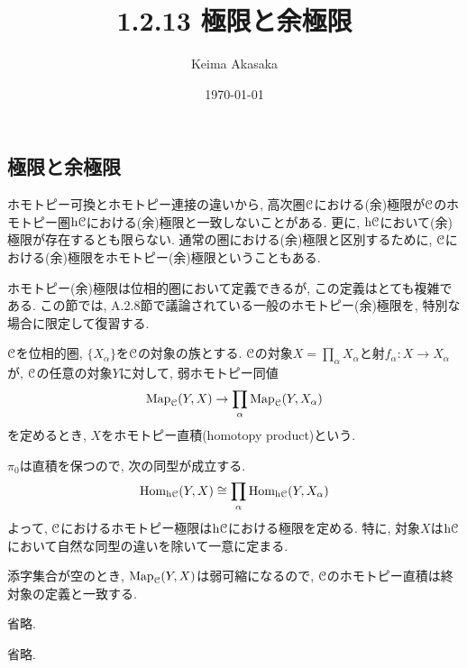 \documentclass[uplatex, a4paper, 14Q, dvipdfmx]{jsreport}
\title{1.2.13 極限と余極限}
\author{Keima Akasaka}
\date{\today}
\begin{document}

\setcounter{chapter}{1}
\setcounter{section}{2} 
\setcounter{subsection}{12}   
\setcounter{subsubsection}{1}

\subsection{極限と余極限}

ホモトピー可換とホモトピー連接の違いから, 高次圏$\mathcal{C}$における(余)極限が$\mathcal{C}$のホモトピー圏$\mathrm{h}\mathcal{C}$における(余)極限と一致しないことがある. 
更に, $\mathrm{h}\mathcal{C}$において(余)極限が存在するとも限らない. 
通常の圏における(余)極限と区別するために, $\mathcal{C}$における(余)極限をホモトピー(余)極限ということもある. 

ホモトピー(余)極限は位相的圏において定義できるが, この定義はとても複雑である. 
この節では, A.2.8節で議論されている一般のホモトピー(余)極限を, 特別な場合に限定して復習する.

\begin{example} \label{eg.1.2.13.1}
  $\mathcal{C}$を位相的圏, $\{X_\alpha\}$を$\mathcal{C}$の対象の族とする. 
  $\mathcal{C}$の対象$X = \prod_{\alpha}X_\alpha$と射$f_\alpha : X \to X_\alpha$が, $\mathcal{C}$の任意の対象$Y$に対して, 弱ホモトピー同値
  \begin{align*}
    \mathrm{Map}_{\mathcal{C}}(Y,X) \to \prod_{\alpha} \mathrm{Map}_{\mathcal{C}}(Y,X_\alpha)
  \end{align*}
  を定めるとき, $X$をホモトピー直積(homotopy product)という. 

  $\pi_0$は直積を保つので, 次の同型が成立する.
  \begin{align*}
    \mathrm{Hom}_{\mathrm{h}\mathcal{C}}(Y,X) \cong \prod_{\alpha} \mathrm{Hom}_{\mathrm{h}\mathcal{C}}(Y,X_\alpha)
  \end{align*}
  よって, $\mathcal{C}$におけるホモトピー極限は$\mathrm{h}\mathcal{C}$における極限を定める. 
  特に, 対象$X$は$\mathrm{h}\mathcal{C}$において自然な同型の違いを除いて一意に定まる. 

  添字集合が空のとき, $\mathrm{Map}_{\mathcal{C}}(Y,X)$は弱可縮になるので, $\mathcal{C}$のホモトピー直積は終対象の定義と一致する. 
\end{example}

\begin{remark} \label{rem.1.2.13.2}
  省略. 
\end{remark}

\begin{remark} \label{rem.1.2.13.3}
  省略. 
\end{remark}
\end{document}
